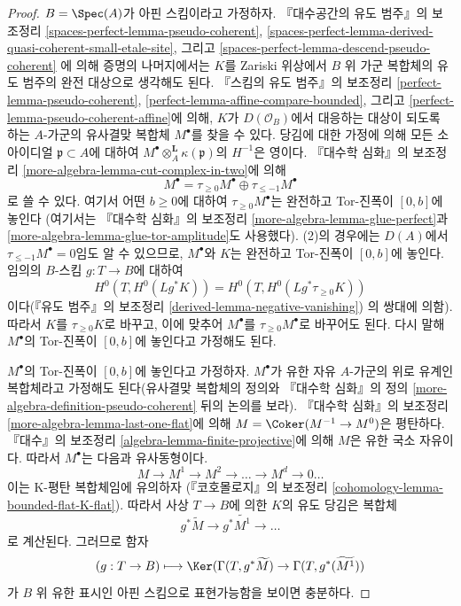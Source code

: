 \begin{proof}
\medskip\noindent
$B = \Spec(A)$가 아핀 스킴이라고 가정하자.
『대수공간의 유도 범주』의 보조정리
\ref{spaces-perfect-lemma-pseudo-coherent},
\ref{spaces-perfect-lemma-derived-quasi-coherent-small-etale-site}, 그리고
\ref{spaces-perfect-lemma-descend-pseudo-coherent}
에 의해 증명의 나머지에서는 $K$를 Zariski 위상에서 $B$ 위 가군
복합체의 유도 범주의 완전 대상으로 생각해도 된다.
『스킴의 유도 범주』의 보조정리
\ref{perfect-lemma-pseudo-coherent},
\ref{perfect-lemma-affine-compare-bounded}, 그리고
\ref{perfect-lemma-pseudo-coherent-affine}에 의해, $K$가
$D(\mathcal{O}_B)$에서 대응하는 대상이 되도록 하는
$A$-가군의 유사결맞 복합체 $M^\bullet$를 찾을 수 있다.
당김에 대한 가정에 의해 모든 소 아이디얼 $\mathfrak p \subset A$에
대하여 $M^\bullet \otimes^\mathbf{L}_A \kappa(\mathfrak p)$의
$H^{-1}$은 영이다. 『대수학 심화』의 보조정리
\ref{more-algebra-lemma-cut-complex-in-two}에 의해
$$
M^\bullet =
\tau_{\geq 0}M^\bullet \oplus \tau_{\leq - 1}M^\bullet
$$
로 쓸 수 있다. 여기서 어떤 $b \geq 0$에 대하여
$\tau_{\geq 0}M^\bullet$는 완전하고 Tor-진폭이 $[0, b]$에 놓인다
(여기서는 『대수학 심화』의 보조정리
\ref{more-algebra-lemma-glue-perfect}과
\ref{more-algebra-lemma-glue-tor-amplitude}도 사용했다).
(2)의 경우에는 $D(A)$에서 $\tau_{\leq - 1}M^\bullet = 0$임도 알 수
있으므로, $M^\bullet$와 $K$는 완전하고 Tor-진폭이 $[0, b]$에 놓인다.
임의의 $B$-스킴 $g : T \to B$에 대하여
$$
H^0(T, H^0(Lg^*K)) = H^0(T, H^0(Lg^*\tau_{\geq 0}K))
$$
이다(『유도 범주』의 보조정리
\ref{derived-lemma-negative-vanishing})
의 쌍대에 의함). 따라서 $K$를 $\tau_{\geq 0}K$로 바꾸고,
이에 맞추어 $M^\bullet$를 $\tau_{\geq 0}M^\bullet$로 바꾸어도 된다.
다시 말해 $M^\bullet$의 Tor-진폭이 $[0, b]$에 놓인다고 가정해도 된다.

\medskip\noindent
$M^\bullet$의 Tor-진폭이 $[0, b]$에 놓인다고 가정하자.
$M^\bullet$가 유한 자유 $A$-가군의 위로 유계인 복합체라고 가정해도
된다(유사결맞 복합체의 정의와 『대수학 심화』의 정의
\ref{more-algebra-definition-pseudo-coherent} 뒤의 논의를 보라).
『대수학 심화』의 보조정리
\ref{more-algebra-lemma-last-one-flat}에 의해
$M = \Coker(M^{- 1} \to M^0)$은 평탄하다.
『대수』의 보조정리 \ref{algebra-lemma-finite-projective}에 의해
$M$은 유한 국소 자유이다. 따라서 $M^\bullet$는 다음과 유사동형이다.
$$
M \to M^1 \to M^2 \to \ldots \to M^d \to 0 \ldots
$$
이는 K-평탄 복합체임에 유의하자
(『코호몰로지』의 보조정리
\ref{cohomology-lemma-bounded-flat-K-flat}).
따라서 사상 $T \to B$에 의한 $K$의 유도 당김은 복합체
$$
g^*\widetilde{M} \to g^*\widetilde{M^1} \to \ldots
$$
로 계산된다. 그러므로 함자
$$
(g : T \to B) \longmapsto
\Ker(
\Gamma(T,g^*\widetilde{M})
\to
\Gamma(T, g^*(\widetilde{M^1})
)
$$
가 $B$ 위 유한 표시인 아핀 스킴으로 표현가능함을 보이면 충분하다.


\end{proof}
